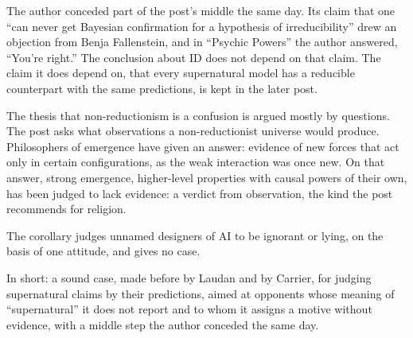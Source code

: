 \begin{afterword}
The author conceded part of the post's middle the same day. Its claim that one ``can never get Bayesian confirmation for a hypothesis of irreducibility'' drew an objection from Benja Fallenstein, and in ``Psychic Powers'' the author answered, ``You're right.'' The conclusion about ID does not depend on that claim. The claim it does depend on, that every supernatural model has a reducible counterpart with the same predictions, is kept in the later post.

The thesis that non-reductionism is a confusion is argued mostly by questions. The post asks what observations a non-reductionist universe would produce. Philosophers of emergence have given an answer: evidence of new forces that act only in certain configurations, as the weak interaction was once new. On that answer, strong emergence, higher-level properties with causal powers of their own, has been judged to lack evidence: a verdict from observation, the kind the post recommends for religion.

The corollary judges unnamed designers of AI to be ignorant or lying, on the basis of one attitude, and gives no case.

In short: a sound case, made before by Laudan and by Carrier, for judging supernatural claims by their predictions, aimed at opponents whose meaning of ``supernatural'' it does not report and to whom it assigns a motive without evidence, with a middle step the author conceded the same day.
\end{afterword}
